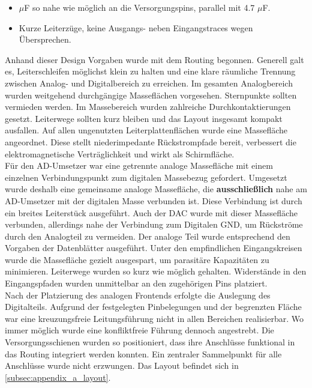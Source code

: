 \documentclass[a4paper, portrait, 12pt]{scrartcl} %
\begin{document}
\begin{itemize}
    \item $\mu$F so nahe wie möglich an die Versorgungspins, parallel mit 4.7 $\mu$F.
    \item Kurze Leiterzüge, keine Ausgangs- neben Eingangstraces wegen Übersprechen.
\end{itemize}

Anhand dieser Design Vorgaben wurde mit dem Routing begonnen. Generell galt es, Leiterschleifen möglichst klein zu halten und eine klare räumliche Trennung zwischen Analog- und Digitalbereich zu erreichen. Im gesamten Analogbereich wurden weitgehend durchgängige Masseflächen vorgesehen. Sternpunkte sollten vermieden werden. Im Massebereich wurden zahlreiche Durchkontaktierungen gesetzt. Leiterwege sollten kurz bleiben und das Layout insgesamt kompakt ausfallen. Auf allen ungenutzten Leiterplattenflächen wurde eine Massefläche angeordnet. Diese stellt niederimpedante Rückstrompfade bereit, verbessert die elektromagnetische Verträglichkeit und wirkt als Schirmfläche.\\

Für den AD-Umsetzer war eine getrennte analoge Massefläche mit einem einzelnen Verbindungspunkt zum digitalen Massebezug gefordert. Umgesetzt wurde deshalb eine gemeinsame analoge Massefläche, die \textbf{ausschließlich} nahe am AD-Umsetzer mit der digitalen Masse verbunden ist. Diese Verbindung ist durch ein breites Leiterstück ausgeführt. Auch der DAC wurde mit dieser Massefläche verbunden, allerdings nahe der Verbindung zum Digitalen GND, um Rückströme durch den Analogteil zu vermeiden. Der analoge Teil wurde entsprechend den Vorgaben der Datenblätter ausgeführt. Unter den empfindlichen Eingangskreisen wurde die Massefläche gezielt ausgespart, um parasitäre Kapazitäten zu minimieren. Leiterwege wurden so kurz wie möglich gehalten. Widerstände in den Eingangspfaden wurden unmittelbar an den zugehörigen Pins platziert.\\

Nach der Platzierung des analogen Frontends erfolgte die Auslegung des Digitalteils. Aufgrund der festgelegten Pinbelegungen und der begrenzten Fläche war eine kreuzungsfreie Leitungsführung nicht in allen Bereichen realisierbar. Wo immer möglich wurde eine konfliktfreie Führung dennoch angestrebt. Die Versorgungsschienen wurden so positioniert, dass ihre Anschlüsse funktional in das Routing integriert werden konnten. Ein zentraler Sammelpunkt für alle Anschlüsse wurde nicht erzwungen. Das Layout befindet sich in \autoref{subsec:appendix_a_layout}.\\
\end{document}
